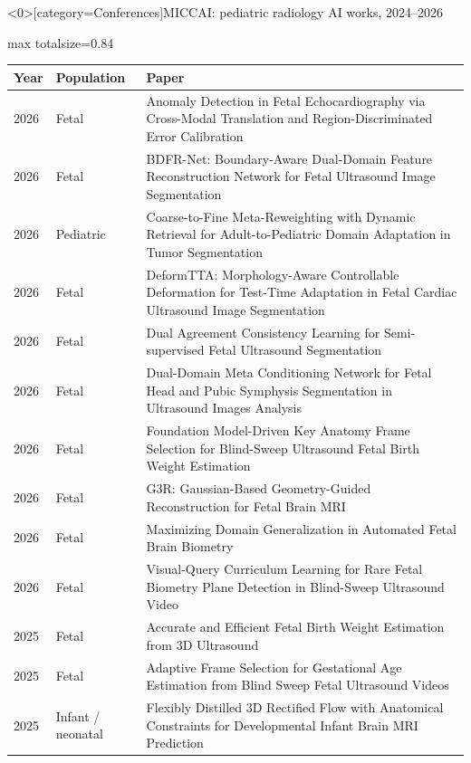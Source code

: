 \documentclass[aspectratio=169]{beamer}
\renewcommand{\arraystretch}{1.08}
\begin{document}
\begin{frame}<0>[category=Conferences]{MICCAI: pediatric radiology AI works, 2024--2026}
\tiny
\begin{adjustbox}{max totalsize={\textwidth}{0.84\textheight}}
\renewcommand{\arraystretch}{1.2}
\begin{tabular}{|l|l|>{\raggedright\arraybackslash}p{}|}
\hline \textbf{Year} & \textbf{Population} & \textbf{Paper} \\ \hline
2026 & Fetal & Anomaly Detection in Fetal Echocardiography via Cross-Modal Translation and Region-Discriminated Error Calibration \\ \hline
2026 & Fetal & BDFR-Net: Boundary-Aware Dual-Domain Feature Reconstruction Network for Fetal Ultrasound Image Segmentation \\ \hline
2026 & Pediatric & Coarse-to-Fine Meta-Reweighting with Dynamic Retrieval for Adult-to-Pediatric Domain Adaptation in Tumor Segmentation \\ \hline
2026 & Fetal & DeformTTA: Morphology-Aware Controllable Deformation for Test-Time Adaptation in Fetal Cardiac Ultrasound Image Segmentation \\ \hline
2026 & Fetal & Dual Agreement Consistency Learning for Semi-supervised Fetal Ultrasound Segmentation \\ \hline
2026 & Fetal & Dual-Domain Meta Conditioning Network for Fetal Head and Pubic Symphysis Segmentation in Ultrasound Images Analysis \\ \hline
2026 & Fetal & Foundation Model-Driven Key Anatomy Frame Selection for Blind-Sweep Ultrasound Fetal Birth Weight Estimation \\ \hline
2026 & Fetal & G3R: Gaussian-Based Geometry-Guided Reconstruction for Fetal Brain MRI \\ \hline
2026 & Fetal & Maximizing Domain Generalization in Automated Fetal Brain Biometry \\ \hline
2026 & Fetal & Visual-Query Curriculum Learning for Rare Fetal Biometry Plane Detection in Blind-Sweep Ultrasound Video \\ \hline
2025 & Fetal & Accurate and Efficient Fetal Birth Weight Estimation from 3D Ultrasound \\ \hline
2025 & Fetal & Adaptive Frame Selection for Gestational Age Estimation from Blind Sweep Fetal Ultrasound Videos \\ \hline
2025 & Infant / neonatal & Flexibly Distilled 3D Rectified Flow with Anatomical Constraints for Developmental Infant Brain MRI Prediction \\ \hline

\end{tabular}
\end{adjustbox}
\end{frame}
\end{document}
